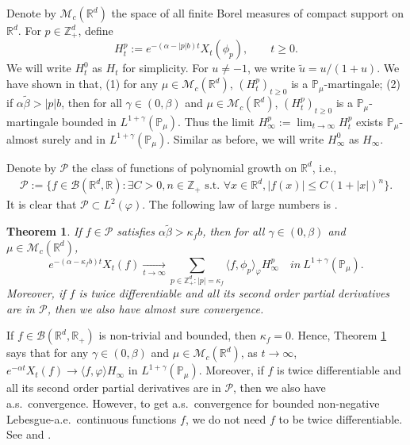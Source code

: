 \documentclass[12pt,a4paper]{amsart}
\theoremstyle{plain}
\newtheorem{thm}{Theorem}[section]
\theoremstyle{definition}
\numberwithin{equation}{section}
\begin{document}
Denote by $\mathcal M_c(\mathbb R^d)$ the space of all finite Borel measures of compact support on $\mathbb R^d$.
For $p\in \mathbb{Z}_+^d$, define
\[
  H_t^p
  := e^{-(\alpha-|p|b)t}X_t(\phi_p), \qquad t\geq 0.
\]
We will write $H^0_t$ as $H_t$ for simplicity.
For $u \neq -1$, we write $\tilde u = u/(1+ u)$.
We have shown in \cite[Lemma 3.2]{RenSongSunZhao2019Stable} that, (1) for any
$\mu\in \mathcal M_c(\mathbb R^d)$, $(H_t^p)_{t\geq 0}$ is a $\mathbb{P}_{\mu}$-martingale; (2)
if $\alpha \tilde \beta>|p|b$, then for all $\gamma\in (0, \beta)$ and $\mu\in \mathcal M_c(\mathbb R^d)$,  $(H_t^p)_{t\geq 0}$ is a $\mathbb{P}_{\mu}$-martingale bounded in $L^{1+\gamma}(\mathbb{P}_{\mu})$.
Thus the limit $H^p_{\infty}:=\lim_{t\rightarrow \infty}H_t^p$ exists $\mathbb{P}_{\mu}$-almost surely and in $L^{1+\gamma}(\mathbb{P}_{\mu})$.
Similar as before, we will write $H^0_\infty$ as $H_\infty$.



Denote by $\mathcal P$ the class of functions of polynomial growth on $\mathbb R^d$, i.e.,
\begin{align}
  \label{eq: polynomial growth function}
  \mathcal{P}
  := \{f\in \mathcal B(\mathbb R^d, \mathbb R):\exists C>0, n \in \mathbb Z_+ \text{~s.t.~} \forall x\in \mathbb R^d, |f(x)|\leq C(1+|x|)^n \}.
\end{align}
It is clear that $\mathcal{P} \subset L^2(\varphi)$. The following law of large numbers is
\cite[Theorem 1.5]{RenSongSunZhao2019Stable}.
\begin{thm}
  \label{thm: law of large number}
  If $f \in \mathcal{P}$ satisfies $\alpha\tilde \beta>\kappa_f b$, then for all $\gamma\in (0, \beta)$ and  $\mu\in \mathcal M_c(\mathbb R^d)$,
  \[
    e^{-(\alpha-\kappa_fb)t}X_t(f)
    \xrightarrow[t\to \infty]{}\sum_{p\in \mathbb Z_+^d:|p|=\kappa_f}\langle f, \phi_p\rangle_{\varphi} H_{\infty}^p
    \quad in~ L^{1+\gamma}(\mathbb{P}_{\mu}).
  \]
  Moreover, if $f$ is twice differentiable and all its second order partial derivatives are in $\mathcal{P}$, then we also have almost sure convergence.
\end{thm}
If $f\in \mathcal B(\mathbb R^d, \mathbb R_+)$ is non-trivial and  bounded, then $\kappa_f=0$.
Hence, Theorem \ref{thm: law of large number} says that for any $\gamma\in (0, \beta)$ and  $\mu\in \mathcal M_c(\mathbb R^d)$, as $t\rightarrow \infty$,
\(
  e^{-\alpha t}X_t(f)
  \rightarrow \langle f, \varphi\rangle H_{\infty}
\)
in $L^{1+\gamma}(\mathbb{P}_{\mu})$.
Moreover, if $f$ is twice differentiable and all its second order partial derivatives are in $\mathcal{P}$, then we also have a.s.\ convergence.
However, to get a.s.\ convergence for bounded non-negative
Lebesgue-a.e.\ continuous functions $f$, we do not need $f$ to be twice differentiable.
See \cite[Theorem 2.13 \& Example 8.1]{ChenRenYang2019Skeleton} and \cite[Theorem 1.2 \& Example 4.1]{EckhoffKyprianouWinkel2015Spines}.
\end{document}
